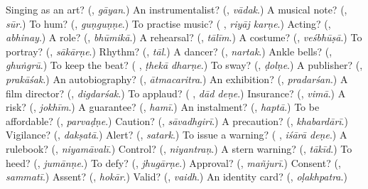 \begin{tcolorbox}[breakable,colback=teal!4,colframe=teal!35!black,title={Before you move on}]
Singing as an art? (\textbf{}, \emph{gāyan}.) An instrumentalist? (\textbf{}, \emph{vādak}.) A musical note? (\textbf{}, \emph{sūr}.) To hum? (\textbf{}, \emph{guṇguṇṇe}.) To practise music? (\textbf{ }, \emph{riyāj karṇe}.) Acting? (\textbf{}, \emph{abhinay}.) A role? (\textbf{}, \emph{bhūmikā}.) A rehearsal? (\textbf{}, \emph{tālīm}.) A costume? (\textbf{}, \emph{veśbhūṣā}.) To portray? (\textbf{}, \emph{sākārṇe}.) Rhythm? (\textbf{}, \emph{tāl}.) A dancer? (\textbf{}, \emph{nartak}.) Ankle bells? (\textbf{}, \emph{ghuṅgrū}.) To keep the beat? (\textbf{ }, \emph{ṭhekā dharṇe}.) To sway? (\textbf{}, \emph{ḍolṇe}.) A publisher? (\textbf{}, \emph{prakāśak}.) An autobiography? (\textbf{}, \emph{ātmacaritra}.) An exhibition? (\textbf{}, \emph{pradarśan}.) A film director? (\textbf{}, \emph{digdarśak}.) To applaud? (\textbf{ }, \emph{dād deṇe}.) Insurance? (\textbf{}, \emph{vimā}.) A risk? (\textbf{}, \emph{jokhīm}.) A guarantee? (\textbf{}, \emph{hamī}.) An instalment? (\textbf{}, \emph{haptā}.) To be affordable? (\textbf{}, \emph{parvaḍṇe}.) Caution? (\textbf{}, \emph{sāvadhgirī}.) A precaution? (\textbf{}, \emph{khabardārī}.) Vigilance? (\textbf{}, \emph{dakṣatā}.) Alert? (\textbf{}, \emph{satark}.) To issue a warning? (\textbf{ }, \emph{iśārā deṇe}.) A rulebook? (\textbf{}, \emph{niyamāvalī}.) Control? (\textbf{}, \emph{niyantraṇ}.) A stern warning? (\textbf{}, \emph{tākīd}.) To heed? (\textbf{}, \emph{jumānṇe}.) To defy? (\textbf{}, \emph{jhugārṇe}.) Approval? (\textbf{}, \emph{mañjurī}.) Consent? (\textbf{}, \emph{sammatī}.) Assent? (\textbf{}, \emph{hokār}.) Valid? (\textbf{}, \emph{vaidh}.) An identity card? (\textbf{}, \emph{oḷakhpatra}.)
\end{tcolorbox}
